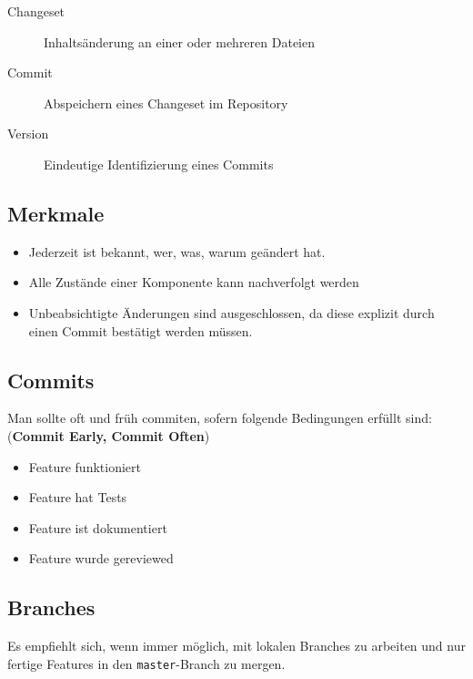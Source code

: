 \begin{description}
	\item[Changeset] Inhaltsänderung an einer oder mehreren Dateien
	\item[Commit] Abspeichern eines Changeset im Repository
	\item[Version] Eindeutige Identifizierung eines Commits
\end{description}

\subsection{Merkmale}
\begin{itemize}
	\item Jederzeit ist bekannt, wer, was, warum geändert hat.
	\item Alle Zustände einer Komponente kann nachverfolgt werden
	\item Unbeabsichtigte Änderungen sind ausgeschlossen, da diese explizit durch einen Commit bestätigt werden müssen.
\end{itemize}

\subsection{Commits}
Man sollte oft und früh commiten, sofern folgende Bedingungen erfüllt sind: (\textbf{Commit Early, Commit Often})
\begin{itemize}
	\item Feature funktioniert
	\item Feature hat Tests
	\item Feature ist dokumentiert
	\item Feature wurde gereviewed
\end{itemize}

\subsection{Branches}
Es empfiehlt sich, wenn immer möglich, mit lokalen Branches zu arbeiten und nur fertige Features in den \lstinline|master|-Branch zu mergen.

